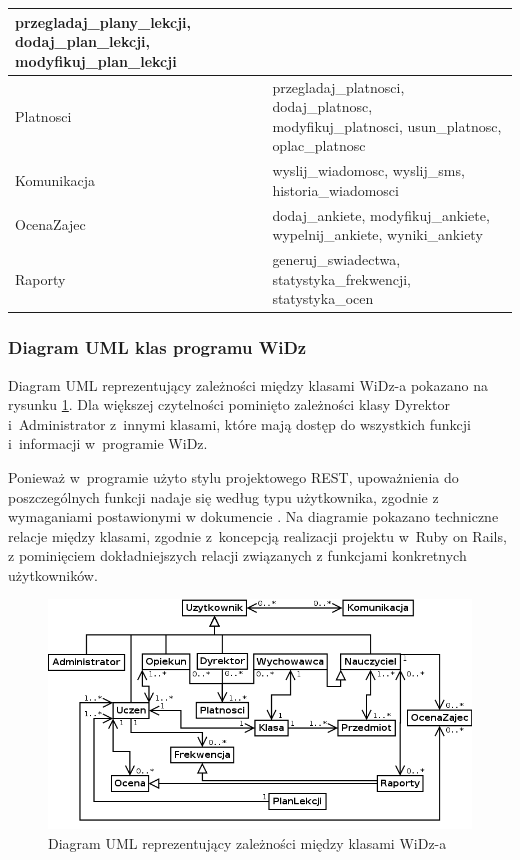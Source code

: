 \documentclass[12pt,leqno,twoside]{mwart}
\begin{document}
\begin{table}[h]
\begin{tabular}{|l|p{12cm}|}
{				przegladaj\_plany\_lekcji, dodaj\_plan\_lekcji, modyfikuj\_plan\_lekcji 
			}\\ \hline
		Platnosci &
			\parbox[t]{12cm}{
			\raggedright			
				przegladaj\_platnosci, dodaj\_platnosc, modyfikuj\_platnosci, usun\_platnosc, oplac\_platnosc 
			}\\ \hline
		Komunikacja & wyslij\_wiadomosc, wyslij\_sms, historia\_wiadomosci \\ \hline
		OcenaZajec &
			\parbox[t]{12cm}{
			\raggedright			
				dodaj\_ankiete, modyfikuj\_ankiete, wypelnij\_ankiete, wyniki\_ankiety 
			}\\ \hline
		Raporty & generuj\_swiadectwa, statystyka\_frekwencji, statystyka\_ocen \\ \hline
		\end{tabular}
	\label{kluczowe_klasy}
\end{table}

\subsubsection{Diagram UML klas programu WiDz}\label{UML}
\noindent Diagram UML reprezentujący zależności między klasami WiDz-a pokazano na rysunku \ref{fig:uml}. Dla większej czytelności pominięto zależności klasy Dyrektor i~Administrator z~innymi klasami, które mają dostęp do wszystkich funkcji i~informacji w~programie WiDz.

\indent Ponieważ w~programie użyto stylu projektowego REST, upoważnienia do poszczególnych funkcji nadaje się według typu użytkownika, zgodnie z wymaganiami postawionymi w dokumencie \cite{WYM}. Na diagramie pokazano techniczne relacje między klasami, zgodnie z~koncepcją realizacji projektu w~Ruby on Rails, z pominięciem dokładniejszych relacji związanych z funkcjami konkretnych użytkowników.
\begin{figure}[ht]
\center
\includegraphics[width=16cm]{uml_klas.png}
\caption{Diagram UML reprezentujący zależności między klasami WiDz-a}
\label{fig:uml}
\end{figure}
\end{document}
